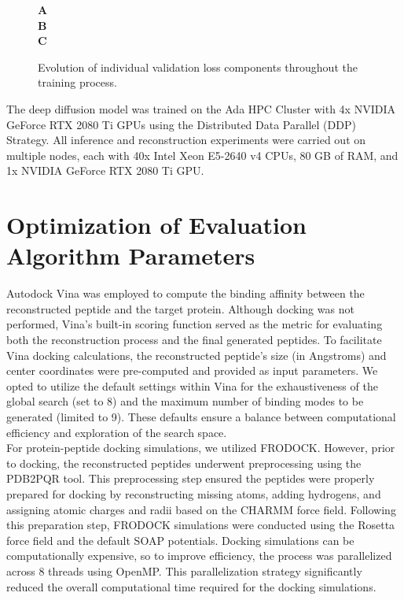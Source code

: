 \begin{figure}
  \center

  \textbf{\Large A}
   \\

  \textbf{\Large B}
   \\

  \textbf{\Large C}

  \caption{Evolution of individual validation loss components throughout the training process.}

  \label{fig:val_metrics}
\end{figure}

The deep diffusion model was trained on the Ada HPC Cluster with 4x NVIDIA GeForce RTX 2080 Ti GPUs using the Distributed Data Parallel (DDP) Strategy. All inference and reconstruction experiments were carried out on multiple nodes, each with 40x Intel Xeon E5-2640 v4 CPUs, 80 GB of RAM, and 1x NVIDIA GeForce RTX 2080 Ti GPU.

\section{Optimization of Evaluation Algorithm Parameters}
Autodock Vina was employed to compute the binding affinity between the reconstructed peptide and the target protein. Although docking was not performed, Vina's built-in scoring function served as the metric for evaluating both the reconstruction process and the final generated peptides. To facilitate Vina docking calculations, the reconstructed peptide's size (in Angstroms) and center coordinates were pre-computed and provided as input parameters. We opted to utilize the default settings within Vina for the exhaustiveness of the global search (set to 8) and the maximum number of binding modes to be generated (limited to 9). These defaults ensure a balance between computational efficiency and exploration of the search space. \\

For protein-peptide docking simulations, we utilized FRODOCK. However, prior to docking, the reconstructed peptides underwent preprocessing using the PDB2PQR tool. This preprocessing step ensured the peptides were properly prepared for docking by reconstructing missing atoms, adding hydrogens, and assigning atomic charges and radii based on the CHARMM force field. Following this preparation step, FRODOCK simulations were conducted using the Rosetta force field and the default SOAP potentials. Docking simulations can be computationally expensive, so to improve efficiency, the process was parallelized across 8 threads using OpenMP. This parallelization strategy significantly reduced the overall computational time required for the docking simulations.

